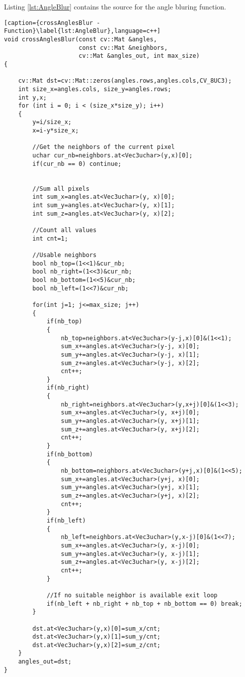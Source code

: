 Listing \vref{lst:AngleBlur} contains the source for the angle bluring function.

\begin{lstlisting}[caption={crossAnglesBlur - Function}\label{lst:AngleBlur},language=c++]
void crossAnglesBlur(const cv::Mat &angles, 
                     const cv::Mat &neighbors, 
                     cv::Mat &angles_out, int max_size)
{

	cv::Mat dst=cv::Mat::zeros(angles.rows,angles.cols,CV_8UC3);
	int size_x=angles.cols, size_y=angles.rows;
	int y,x;
	for (int i = 0; i < (size_x*size_y); i++)
	{
		y=i/size_x;
		x=i-y*size_x;

		//Get the neighbors of the current pixel
		uchar cur_nb=neighbors.at<Vec3uchar>(y,x)[0];
		if(cur_nb == 0) continue;


		//Sum all pixels
		int sum_x=angles.at<Vec3uchar>(y, x)[0];
		int sum_y=angles.at<Vec3uchar>(y, x)[1];
		int sum_z=angles.at<Vec3uchar>(y, x)[2];

		//Count all values
		int cnt=1;

		//Usable neighbors
		bool nb_top=(1<<1)&cur_nb;
		bool nb_right=(1<<3)&cur_nb;
		bool nb_bottom=(1<<5)&cur_nb;
		bool nb_left=(1<<7)&cur_nb;

		for(int j=1; j<=max_size; j++)
		{
			if(nb_top)
			{
				nb_top=neighbors.at<Vec3uchar>(y-j,x)[0]&(1<<1);
				sum_x+=angles.at<Vec3uchar>(y-j, x)[0];
				sum_y+=angles.at<Vec3uchar>(y-j, x)[1];
				sum_z+=angles.at<Vec3uchar>(y-j, x)[2];
				cnt++;
			}
			if(nb_right)
			{
				nb_right=neighbors.at<Vec3uchar>(y,x+j)[0]&(1<<3);
				sum_x+=angles.at<Vec3uchar>(y, x+j)[0];
				sum_y+=angles.at<Vec3uchar>(y, x+j)[1];
				sum_z+=angles.at<Vec3uchar>(y, x+j)[2];
				cnt++;
			}
			if(nb_bottom)
			{
				nb_bottom=neighbors.at<Vec3uchar>(y+j,x)[0]&(1<<5);
				sum_x+=angles.at<Vec3uchar>(y+j, x)[0];
				sum_y+=angles.at<Vec3uchar>(y+j, x)[1];
				sum_z+=angles.at<Vec3uchar>(y+j, x)[2];
				cnt++;
			}
			if(nb_left)
			{
				nb_left=neighbors.at<Vec3uchar>(y,x-j)[0]&(1<<7);
				sum_x+=angles.at<Vec3uchar>(y, x-j)[0];
				sum_y+=angles.at<Vec3uchar>(y, x-j)[1];
				sum_z+=angles.at<Vec3uchar>(y, x-j)[2];
				cnt++;
			}

			//If no suitable neighbor is available exit loop
			if(nb_left + nb_right + nb_top + nb_bottom == 0) break;
		}

		dst.at<Vec3uchar>(y,x)[0]=sum_x/cnt;
		dst.at<Vec3uchar>(y,x)[1]=sum_y/cnt;
		dst.at<Vec3uchar>(y,x)[2]=sum_z/cnt;
	}
	angles_out=dst;
}
\end{lstlisting}

